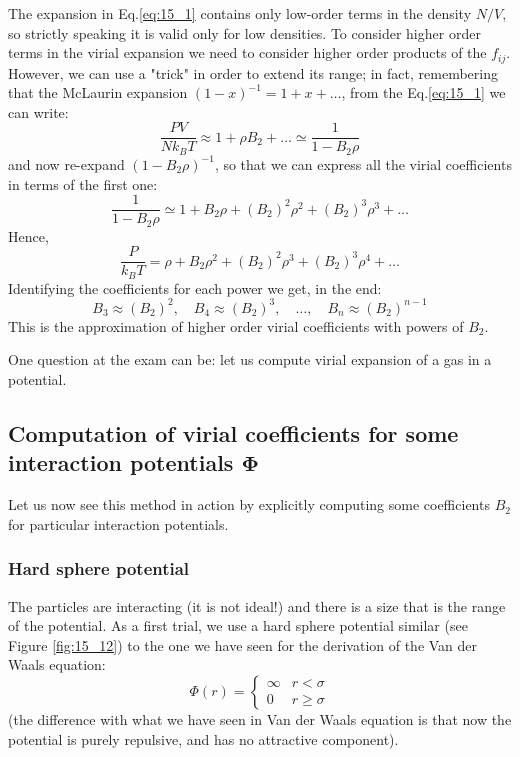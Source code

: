 \documentclass[../../Main/Main.tex]{subfiles}
\begin{document}
The expansion in Eq.\eqref{eq:15_1} contains only low-order terms in the density \( N/V \), so strictly speaking it is valid only for low densities. To consider higher order terms in the virial expansion we need to consider higher order products of the \( f_{ij} \).
However, we can use a "trick" in order to extend its range; in fact, remembering that the McLaurin expansion \(  (1-x)^{-1} = 1 + x + \dots \), from the Eq.\eqref{eq:15_1} we can write:
\begin{equation*}
  \frac{PV}{N k_B T} \approx 1 + \rho B_2 + \dots \simeq \frac{1}{1-B_2 \rho }
\end{equation*}
and now re-expand \( (1-B_2 \rho )^{-1} \), so that we can express all the virial coefficients in terms of the first one:
\begin{equation*}
  \frac{1}{1-B_2 \rho } \simeq  1 + B_2 \rho + (B_2)^2 \rho ^2  + (B_2)^3 \rho ^3 + \dots
\end{equation*}
Hence,
\begin{equation*}
  \frac{P}{k_B T} = \rho  + B_2 \rho ^2 + (B_2)^2 \rho ^3 + (B_2)^3 \rho ^4 + \dots
\end{equation*}
Identifying the coefficients for each power we get, in the end:
\begin{equation*}
  B_3 \approx (B_2)^2, \quad B_4 \approx (B_2)^3, \quad \dots, \quad B_n \approx (B_2)^{n-1}
\end{equation*}
This is the approximation of higher order virial coefficients with powers of \( B_2 \).
\begin{remark}
One question at the exam can be: let us compute virial expansion of a gas in a potential.
\end{remark}


\subsection{ Computation of virial coefficients for some interaction potentials \( \pmb{\Phi } \)}
Let us now see this method in action by explicitly computing some coefficients \( B_2 \) for particular interaction potentials.

\subsubsection{Hard sphere potential}
The particles are interacting (it is not ideal!) and there is a size that is the range of the potential.
As a first trial, we use a hard sphere potential similar (see Figure \ref{fig:15_12}) to the one we have seen for the derivation of the Van der Waals equation:
\begin{equation}
  \Phi (r) = \begin{cases}
    \infty & r < \sigma \\
    0     & r \ge \sigma
\end{cases}
\end{equation}
(the difference with what we have seen in Van der Waals equation is that now the potential is purely repulsive, and has no attractive component).
\end{document}

